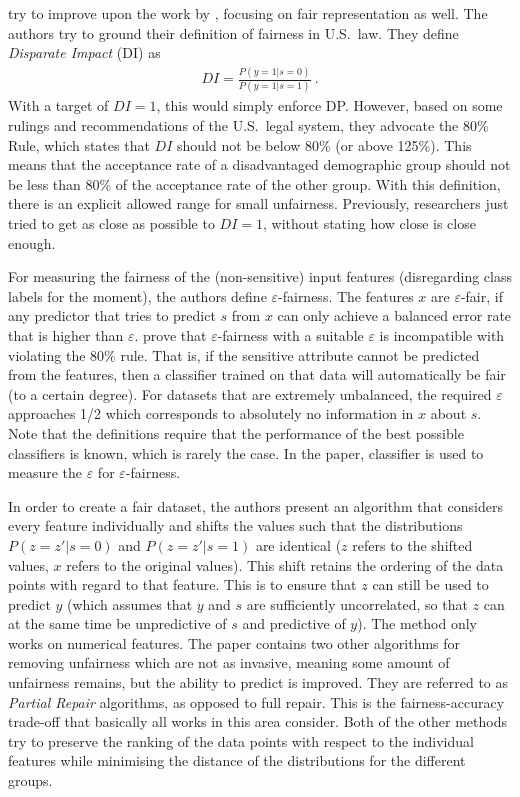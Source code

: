 \citet{feldman2015certifying} try to improve upon the work by \citet{zemel2013learning},
focusing on fair representation as well.
The authors try to ground their definition of fairness in U.S.\ law.
They define \emph{Disparate Impact} (DI) as
\begin{align}
  \label{eq:disparate-impace}
  DI = \frac{P(y=1|s=0)}{P(y=1|s=1)} ~.
\end{align}
With a target of \(DI = 1\), this would simply enforce \ac{DP}.
However, based on some rulings and recommendations of the U.S.\ legal system,
they advocate the 80\% Rule, which states that \(DI\) should not be below 80\% (or above 125\%).
This means that the acceptance rate of a disadvantaged demographic group
should not be less than 80\% of the acceptance rate of the other group.
With this definition, there is an explicit allowed range for small unfairness.
Previously, researchers just tried to get as close as possible to \(DI = 1\),
without stating how close is close enough.

For measuring the fairness of the (non-sensitive) input features
(disregarding class labels for the moment), the authors define \(\varepsilon\)-fairness.
The features \(x\) are \(\varepsilon\)-fair,
if any predictor that tries to predict \(s\) from \(x\) can only achieve a balanced error rate
that is higher than \(\varepsilon\).
\citet{feldman2015certifying} prove that \(\varepsilon\)-fairness with a suitable \(\varepsilon\)
is incompatible with violating the 80\% rule.
That is, if the sensitive attribute cannot be predicted from the features,
then a classifier trained on that data will automatically be fair (to a certain degree).
For datasets that are extremely unbalanced,
the required \(\varepsilon\) approaches 1/2
which corresponds to absolutely no information in \(x\) about \(s\).
Note that the definitions require that the performance of the best possible classifiers is known,
which is rarely the case.
In the paper,  classifier is used to measure the \(\varepsilon\) for \(\varepsilon\)-fairness.

In order to create a fair dataset,
the authors present an algorithm that considers every feature individually
and shifts the values such that the distributions \(P(z=z'|s=0)\) and \(P(z=z'|s=1)\) are identical
(\(z\) refers to the shifted values, \(x\) refers to the original values).
This shift retains the ordering of the data points with regard to that feature.
This is to ensure that \(z\) can still be used to predict \(y\)
(which assumes that \(y\) and \(s\) are sufficiently uncorrelated,
so that \(z\) can at the same time be unpredictive of \(s\) and predictive of \(y\)).
The method only works on numerical features.
The paper contains two other algorithms for removing unfairness which are not as invasive,
meaning some amount of unfairness remains, but the ability to predict is improved.
They are referred to as \emph{Partial Repair} algorithms, as opposed to full repair.
This is the fairness-accuracy trade-off that basically all works in this area consider.
Both of the other methods try to preserve the ranking of the data points
with respect to the individual features
while minimising the distance of the distributions for the different groups.

